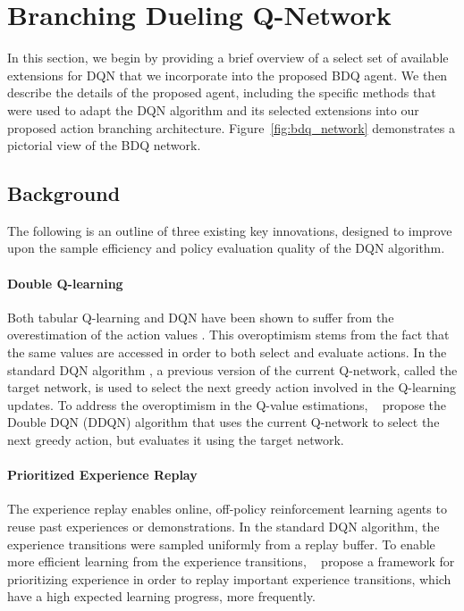 \documentclass[letterpaper]{article} %
\newcommand{\citet}[1]
{\citeauthor{#1}~\shortcite{#1}}
\newcommand{\citep}{\cite}
\begin{document}
\section{Branching Dueling Q-Network}
\label{sec:bdq}

In this section, we begin by providing a brief overview of a select set of available extensions for DQN that we incorporate into the proposed BDQ agent. We then describe the details of the proposed agent, including the specific methods that were used to adapt the DQN algorithm and its selected extensions into our proposed action branching architecture. Figure~\ref{fig:bdq_network} demonstrates a pictorial view of the BDQ network.


\subsection{Background}
\label{subsec:background}

The following is an outline of three existing key innovations, designed to improve upon the sample efficiency and policy evaluation quality of the DQN algorithm.

\paragraph{Double Q-learning} Both tabular Q-learning and DQN have been shown to suffer from the overestimation of the action values \citep{Hasselt:2010dq,Hasselt:2016ddq}. This overoptimism stems from the fact that the same values are accessed in order to both select and evaluate actions. In the standard DQN algorithm \citep{Mnih:2013,Mnih:2015natureDQN}, a previous version of the current Q-network, called the target network, is used to select the next greedy action involved in the Q-learning updates. To address the overoptimism in the Q-value estimations, \citet{Hasselt:2016ddq} propose the Double DQN (DDQN) algorithm that uses the current Q-network to select the next greedy action, but evaluates it using the target network.

\paragraph{Prioritized Experience Replay} The experience replay enables online, off-policy reinforcement learning agents to reuse past experiences or demonstrations. In the standard DQN algorithm, the experience transitions were sampled uniformly from a replay buffer. To enable more efficient learning from the experience transitions, \citet{Schaul:2016prior} propose a framework for prioritizing experience in order to replay important experience transitions, which have a high expected learning progress, more frequently.
\end{document}
